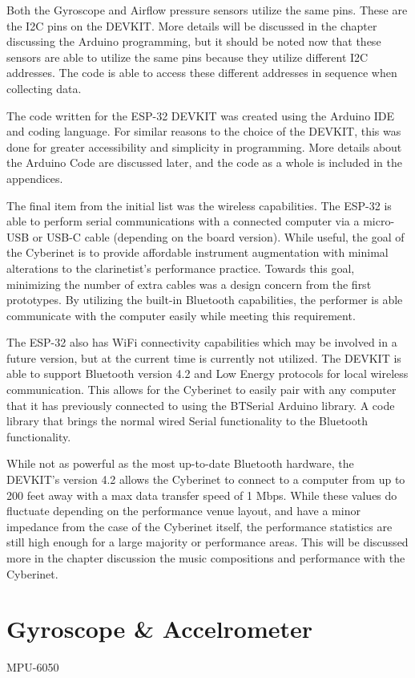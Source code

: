 Both the Gyroscope and Airflow pressure sensors utilize the same pins. These are the I2C pins on the DEVKIT. More details will be discussed in the chapter discussing the Arduino programming, but it should be noted now that these sensors are able to utilize the same pins because they utilize different I2C addresses. The code is able to access these different addresses in sequence when collecting data.

The code written for the ESP-32 DEVKIT was created using the Arduino IDE and coding language. For similar reasons to the choice of the DEVKIT, this was done for greater accessibility and simplicity in programming. More details about the Arduino Code are discussed later, and the code as a whole is included in the appendices.

The final item from the initial list was the wireless capabilities. The ESP-32 is able to perform serial communications with a connected computer via a micro-USB or USB-C cable (depending on the board version). While useful, the goal of the Cyberinet is to provide affordable instrument augmentation with minimal alterations to the clarinetist's performance practice. Towards this goal, minimizing the number of extra cables was a design concern from the first prototypes. By utilizing the built-in Bluetooth capabilities, the performer is able communicate with the computer easily while meeting this requirement.

The ESP-32 also has WiFi connectivity capabilities which may be involved in a future version, but at the current time is currently not utilized. The DEVKIT is able to support Bluetooth version 4.2 and Low Energy protocols for local wireless communication. This allows for the Cyberinet to easily pair with any computer that it has previously connected to using the BTSerial Arduino library. A code library that brings the normal wired Serial functionality to the Bluetooth functionality.

While not as powerful as the most up-to-date Bluetooth hardware, the DEVKIT's version 4.2 allows the Cyberinet to connect to a computer from up to 200 feet away with a max data transfer speed of 1 Mbps. While these values do fluctuate depending on the performance venue layout, and have a minor impedance from the case of the Cyberinet itself, the performance statistics are still high enough for a large majority or performance areas. This will be discussed more in the chapter discussion the music compositions and performance with the Cyberinet.

\section{Gyroscope \& Accelrometer}
MPU-6050


